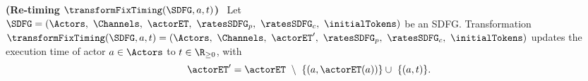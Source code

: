 \begin{definition}
{\textbf{(Re-timing $\transformFixTiming(\SDFG,a,t)$)}}~\label{def:transformFixTiming}
Let $\SDFG = (\Actors,\ \Channels,\ \actorET,\ \ratesSDFG_p,\ \ratesSDFG_c,\ \initialTokens)$ be an SDFG. 
Transformation $\transformFixTiming(\SDFG,a,t)= (\Actors,\ \Channels,\ \actorET^{\prime},\ \ratesSDFG_p,\ \ratesSDFG_c,\ \initialTokens)$ updates the execution time of actor $a\in\Actors$ to $t\in  \R_{\geq 0}$, with 
\begin{equation}
\actorET^{\prime}=\actorET\ \setminus\ \{(a,\actorET(a))\} \cup\ \{(a,t)\}.  \nonumber
\end{equation}
\end{definition}